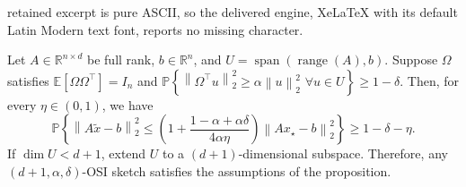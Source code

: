 \documentclass[10pt,a4paper]{amsart}
\newcommand{\E}{\mathbb{E}}
\newcommand{\Prob}{\mathbb{P}}
\newcommand{\R}{\mathbb{R}}
\newcommand{\norm}[1]{\left\lVert #1 \right\rVert}
\newcommand{\range}{\operatorname{range}}
\begin{document}
retained excerpt is pure ASCII, so the delivered engine, XeLaTeX with its default Latin Modern text font, reports no missing character.
\begin{proposition}
\label{prop:ls-p-one}
Let $A\in\R^{n\times d}$ be full rank,  $b\in\R^n$, and $U = \operatorname{span}(\range(A),b)$.  Suppose $\Omega$ satisfies $\E[\Omega\Omega^\top] = I_n$ and $\Prob\!\left\{
\norm{\Omega^\top u}_2^2 \ge \alpha \norm{u}_2^2\,\, \forall u \in U\right\}\ge 1 - \delta$.  Then,  for every $\eta\in(0,1)$, we have
\[
\Prob\!\left\{
\norm{A\widetilde x-b}_2^2
\le
\left(1+\frac{1-\alpha+\alpha\delta}{4\alpha\eta}\right)\norm{Ax_\star-b}_2^2
\right\}
\ge 1-\delta-\eta.
\]
If $\dim U<d+1$, extend $U$ to a $(d+1)$-dimensional subspace. Therefore, any $(d+1,\alpha,\delta)$-OSI sketch satisfies the assumptions of the proposition.
\end{proposition}
\end{document}
